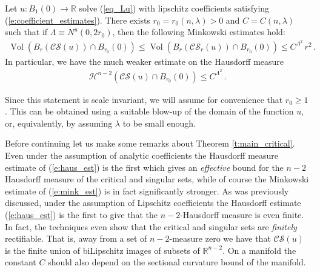 \documentclass[11pt]{article}
\begin{document}
\begin{theorem}\label{t:main_critical}
Let $u:B_1(0)\to {\mathds{R}}$ solve (\ref{eq_Lu}) with lipschitz coefficients satisfying (\ref{e:coefficient_estimates}). There exists $r_0=r_0(n,\lambda)>0$ and $C=C(n,\lambda)$ such that if $\Lambda\equiv N^u(0,2r_0)$, then the following Minkowski estimates hold:
\begin{align}\label{e:mink_est}
{\operatorname{Vol}}(B_r({\mathcal{CS}}(u))\cap B_{r_0}(0)) \leq {\operatorname{Vol}}(B_r({\mathcal{CS}}_r(u))\cap B_{r_0}(0)) \leq C^{\Lambda^2}\, r^2\, .
\end{align}
In particular, we have the much weaker estimate on the Hausdorff measure
\begin{align}\label{e:haus_est}
{\mathcal{H}}^{n-2}({\mathcal{CS}}(u)\cap B_{r_0}(0))\leq C^{\Lambda^2}\, .
\end{align}
\end{theorem}

\begin{remark}
Since this statement is scale invariant, we will assume for convenience that $r_0\geq 1$. This can be obtained using a suitable blow-up of the domain of the function $u$, or, equivalently, by assuming $\lambda$ to be small enough.
\end{remark}

Before continuing let us make some remarks about Theorem \ref{t:main_critical}.  Even under the assumption of analytic coefficients the Hausdorff measure estimate of (\ref{e:haus_est}) is the first which gives an {\it effective} bound for the $n-2$ Hausdorff measure of the critical and singular sets, while of course the Minkowski estimate of (\ref{e:mink_est}) is in fact significantly stronger.  As was previously discussed, under the assumption of Lipschitz coefficients the Hausdorff estimate (\ref{e:haus_est}) is the first to give that the $n-2$-Hausdorff measure is even finite.  In fact, the techniques even show that the critical and singular sets are {\it finitely} rectifiable.  That is, away from a set of $n-2$-measure zero we have that ${\mathcal{CS}}(u)$ is the finite union of biLipschitz images of subsets of ${\mathds{R}}^{n-2}$.  On a manifold the constant $C$ should also depend on the sectional curvature bound of the manifold.
\end{document}
